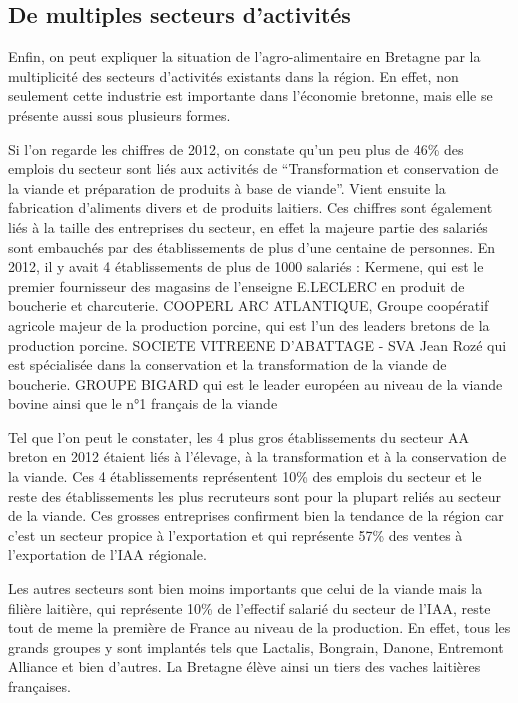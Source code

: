 \documentclass[a4paper,12pt]{report}
\begin{document}
		\subsection{De multiples secteurs d'activités}
			Enfin, on peut expliquer la situation de l'agro-alimentaire en Bretagne par la multiplicité des secteurs d'activités existants dans la région. En effet, non seulement cette industrie est importante dans l'économie bretonne, mais elle se présente aussi sous plusieurs formes.
			
			
			Si l’on regarde les chiffres de 2012, on constate qu’un peu plus de 46\% des emplois du secteur sont liés aux activités de  “Transformation et conservation de la viande et préparation de produits à base de viande”. Vient ensuite la fabrication d’aliments divers et de produits laitiers. Ces chiffres sont également liés à la taille des entreprises du secteur, en effet la majeure partie des salariés sont embauchés par des établissements de plus d’une centaine de personnes. En 2012, il y avait 4 établissements de plus de 1000 salariés :
			Kermene, qui est le premier fournisseur des magasins de l’enseigne E.LECLERC en produit de boucherie et charcuterie.
			COOPERL ARC ATLANTIQUE, Groupe coopératif agricole majeur de la production porcine, qui est l’un des leaders bretons de la production porcine.
			SOCIETE VITREENE D’ABATTAGE - SVA Jean Rozé qui est spécialisée dans la conservation et la transformation de la viande de boucherie.
			GROUPE BIGARD qui est le leader européen au niveau de la viande bovine ainsi que le n°1 français de la viande\cite{BigardPremierTransformateurViande}
			
			Tel que l’on peut le constater, les 4 plus gros établissements du secteur AA breton en 2012 étaient liés à l’élevage, à la transformation et à la conservation de la viande. Ces 4 établissements représentent 10\% des emplois du secteur et le reste des établissements les plus recruteurs sont pour la plupart reliés au secteur de la viande. Ces grosses entreprises confirment bien la tendance de la région car c’est un secteur propice à l’exportation et qui représente 57\% des ventes à l’exportation de l’IAA régionale.
			
			Les autres secteurs sont bien moins importants que celui de la viande mais la filière laitière, qui représente 10\% de l’effectif salarié du secteur de l’IAA, reste tout de meme la première de France au niveau de la production. En effet, tous les grands groupes y sont implantés tels que Lactalis, Bongrain, Danone, Entremont Alliance et bien d’autres\cite{ProduitsLaitiersRegionBretagne}. La Bretagne élève ainsi un tiers des vaches laitières françaises.
			
\end{document}
